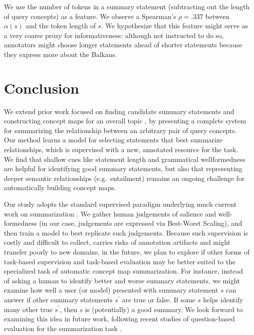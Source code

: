 \documentclass[11pt,a4paper]{article}
\begin{document}
We use the number of tokens in a summary statement (subtracting out the length of query concepts) as a feature. We observe a Spearman's $\rho=.337$ between $\alpha(s)$ and the token length of $s$.  We hypothesize that this feature might serve as a very coarse proxy for informativeness: although not instructed to do so, annotators might choose longer statements ahead of shorter statements because they express more about the Balkans.

\section{Conclusion}\label{s:conclusion}

We extend prior work focused on finding candidate summary statements \cite{N18-1159} and constructing concept maps for an overall topic \cite{emnlp2017conceptmaps}, by presenting a complete system for summarizing the relationship between an arbitrary pair of query concepts. Our method learns a model for selecting statements that best summarize relationships, which is supervised with a new, annotated resource for the task. We find that shallow cues like statement length and grammatical wellformedness are helpful for identifying good summary statements, but also that representing deeper semantic relationships (e.g.\ entailment) remains an ongoing challenge for automatically building concept maps. 

Our study adopts the standard supervised paradigm underlying much current work on summarization \cite{Hermann2015TeachingMT,N18-1065}. We gather human judgements of salience and well-formedness (in our case, judgements are expressed via Best-Worst Scaling), and then train a model to best replicate such judgements. Because such supervision is costly and difficult to collect, carries risks of annotation artifacts \cite{N18-2017} and might transfer poorly to new domains, in the future, we plan to explore if other forms of task-based supervision and task-based evaluation \cite{Jing1998SummarizationEM} may be better suited to the specialized task of automatic concept map summarization. For instance, instead of asking a human to identify better and worse summary statements, we might examine how well a user (or model) presented with summary statement $s$ can answer if other summary statements $s^\prime$ are true or false. If some $s$ helps identify many other true $s^{\prime}$, then $s$ is (potentially) a good summary. We look forward to examining this idea in future work, following recent studies of question-based evaluation for the summarization task \cite{eyal-etal-2019-question}.
\end{document}
